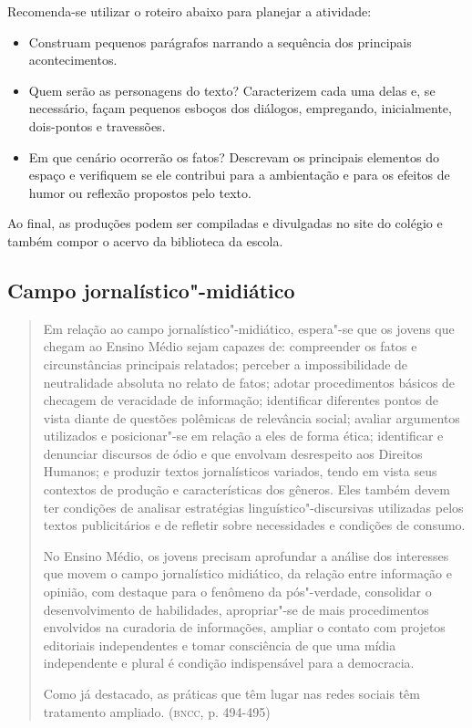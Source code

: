 \documentclass[12pt]{extarticle}
\begin{document}
Recomenda-se utilizar o roteiro abaixo para planejar a atividade:

\begin{itemize}
\item
Construam pequenos parágrafos narrando a sequência dos principais
acontecimentos.
\item
Quem serão as personagens do texto? Caracterizem cada uma delas e, se
necessário, façam pequenos esboços dos diálogos, empregando,
inicialmente, dois-pontos e travessões.
\item
Em que cenário ocorrerão os fatos? Descrevam os principais elementos
do espaço e verifiquem se ele contribui para a ambientação e para os
efeitos de humor ou reflexão propostos pelo texto.
\end{itemize}

Ao final, as produções podem ser compiladas e divulgadas no site do
colégio e também compor o acervo da biblioteca da escola.

\subsection{Campo jornalístico"-midiático}

\begin{quote}
Em relação ao campo jornalístico"-midiático, espera"-se que os jovens
que chegam ao Ensino Médio sejam capazes de: compreender os fatos e
circunstâncias principais relatados; perceber a impossibilidade de
neutralidade absoluta no relato de fatos; adotar procedimentos básicos
de checagem de veracidade de informação; identificar diferentes pontos
de vista diante de questões polêmicas de relevância social; avaliar
argumentos utilizados e posicionar"-se em relação a eles de forma ética;
identificar e denunciar discursos de ódio e que envolvam desrespeito aos
Direitos Humanos; e produzir textos jornalísticos variados, tendo em
vista seus contextos de produção e características dos gêneros. Eles
também devem ter condições de analisar estratégias
linguístico"-discursivas utilizadas pelos textos publicitários e de
refletir sobre necessidades e condições de consumo.

No Ensino Médio, os jovens precisam aprofundar a análise dos interesses
que movem o campo jornalístico midiático, da relação entre informação e
opinião, com destaque para o fenômeno da pós"-verdade, consolidar o
desenvolvimento de habilidades, apropriar"-se de mais procedimentos
envolvidos na curadoria de informações, ampliar o contato com projetos
editoriais independentes e tomar consciência de que uma mídia
independente e plural é condição indispensável para a democracia.

Como já destacado, as práticas que têm lugar nas redes sociais têm
tratamento ampliado. (\textsc{bncc}, p. 494-495)
\end{quote}
\end{document}
